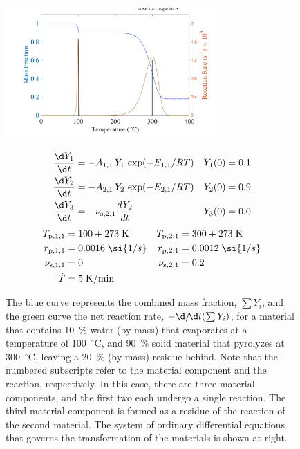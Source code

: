 \documentclass[11pt]{book}
\begin{document}
\begin{figure}[ht]
\noindent
\begin{minipage}{0.5\textwidth}
\includegraphics[width=3.2in]{SCRIPT_FIGURES/pyrolysis_2}
\end{minipage}
\hfill
\begin{minipage}{0.5\textwidth}
\footnotesize
\begin{align*}
   \frac{\d Y_1}{\d t} &= -A_{1,1} \, Y_1 \, \exp(-E_{1,1}/RT)                  & Y_1(0) &=0.1 \\
   \frac{\d Y_2}{\d t} &= -A_{2,1} \, Y_2 \, \exp(-E_{2,1}/RT)                  & Y_2(0) &=0.9 \\
   \frac{\d Y_3}{\d t} &= -\nu_{{\rm s},2,1} \frac{dY_2}{dt}                          & Y_3(0) &=0.0
\end{align*}
\begin{align*}
   T_{{\rm p},1,1} &= 100+273 \; \mathrm{K}        & T_{{\rm p},2,1}   &= 300+273 \; \mathrm{K} \\
   r_{{\rm p},1,1} &= 0.0016 \; \si{1/s}           & r_{{\rm p},2,1}   &= 0.0012 \;\si{1/s} \\
   \nu_{{\rm s},1,1} &= 0                          & \nu_{{\rm s},2,1} &= 0.2 \\
   \dot{T} &= 5 \; \mathrm{K/min} & &
\end{align*}
\end{minipage} \normalsize
\caption[A more complicated demonstration of the pyrolysis model]{The blue curve represents the combined mass fraction, $\sum Y_i$, and the green curve the net reaction rate, $-\d/\!\d t(\sum Y_i)$, for a material that contains 10~\% water (by mass) that evaporates at a temperature of 100~$^\circ$C, and 90~\% solid material that pyrolyzes at 300~$^\circ$C, leaving a 20~\% (by mass) residue behind. Note that the numbered subscripts refer to the material component and the reaction, respectively. In this case, there are three material components, and the first two each undergo a single reaction. The third material component is formed as a residue of the reaction of the second material.
The system of ordinary differential equations that governs the transformation of the materials is shown at right.}
\label{pyrolysis_2}
\end{figure}
\end{document}
